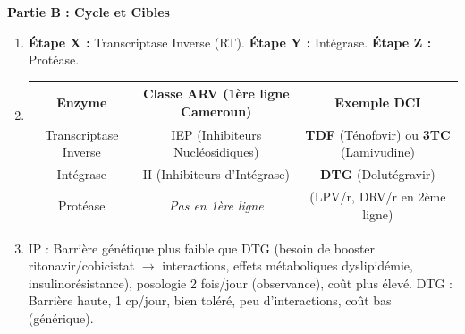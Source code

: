 \documentclass[11pt]{article}
\begin{document}
\begin{corrige}
\textbf{Partie B : Cycle et Cibles}
\begin{enumerate}
\item \textbf{Étape X :} Transcriptase Inverse (RT). \textbf{Étape Y :} Intégrase. \textbf{Étape Z :} Protéase.
\item \begin{center}
\begin{tabular}{|c|c|c|}\hline
\textbf{Enzyme} & \textbf{Classe ARV (1ère ligne Cameroun)} & \textbf{Exemple DCI} \\ \hline
Transcriptase Inverse & IEP (Inhibiteurs Nucléosidiques) & \textbf{TDF} (Ténofovir) ou \textbf{3TC} (Lamivudine) \\ \hline
Intégrase & II (Inhibiteurs d'Intégrase) & \textbf{DTG} (Dolutégravir) \\ \hline
Protéase & \textit{Pas en 1ère ligne} & (LPV/r, DRV/r en 2ème ligne) \\ \hline
\end{tabular}
\end{center}
\item IP : Barrière génétique plus faible que DTG (besoin de booster ritonavir/cobicistat $\to$ interactions, effets métaboliques dyslipidémie, insulinorésistance), posologie 2 fois/jour (observance), coût plus élevé. DTG : Barrière haute, 1 cp/jour, bien toléré, peu d'interactions, coût bas (générique).
\end{enumerate}


\end{corrige}
\end{document}
